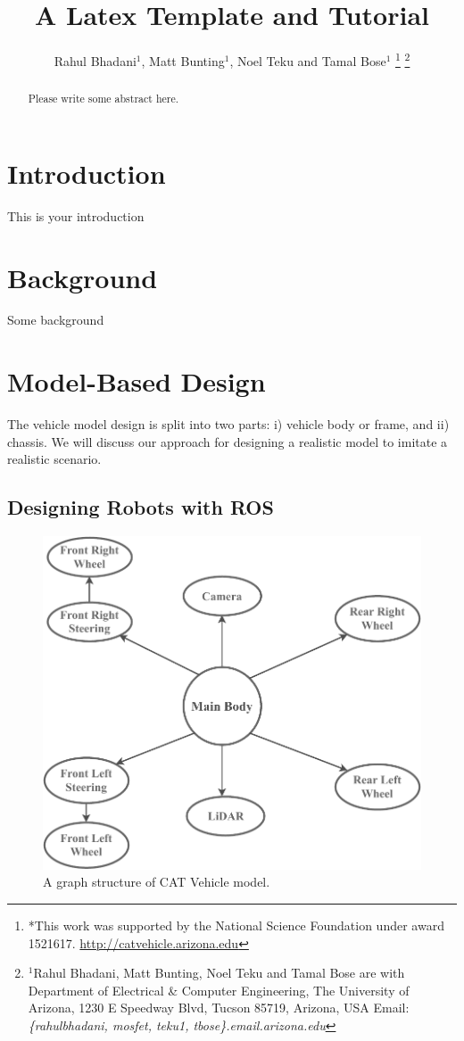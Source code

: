 \documentclass[letterpaper, 10 pt, conference]{ieeeconf}  %
\title{\LARGE \bf
A Latex Template and Tutorial
}
\author{Rahul Bhadani$^{1}$, Matt Bunting$^{1}$, Noel Teku  and Tamal Bose$^{1}$%
\thanks{*This work was supported by the National Science Foundation under award 1521617. \url{http://catvehicle.arizona.edu}}%
\thanks{$^{1}$Rahul Bhadani, Matt Bunting, Noel Teku and Tamal Bose are  with Department of Electrical \& Computer Engineering,
       The University of Arizona, 1230 E Speedway Blvd, Tucson 85719, Arizona, USA
        {Email: \sl\footnotesize \{rahulbhadani, mosfet, teku1, tbose\}.email.arizona.edu}}%
}
\begin{document}
\maketitle
\thispagestyle{empty}
\pagestyle{empty}


\begin{abstract}
Please write some abstract here.

\end{abstract}


\section{Introduction}
\label{sec:intro}
This is your introduction

\section{Background}
\label{sec:background}
Some background

\section{Model-Based Design}
\label{sec:mbd}
The vehicle model design is split into two parts: i) vehicle body or frame, and ii) chassis. We will discuss our approach for designing a realistic model to imitate a realistic scenario.

\subsection{Designing Robots with ROS}


 \begin{figure}[htbp]
    \centering
    \includegraphics[angle=0,origin=c,trim={0.0cm 0.0cm 0.0cm 0.0cm},clip,width=1.0\linewidth]{urdfstruct.pdf}
    \caption{A graph structure of CAT Vehicle model.}
    \label{fig:urdfstruct}
    \end{figure}
    
\end{document}
